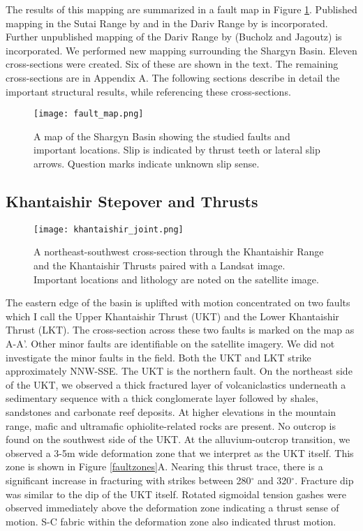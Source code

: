 The results of this mapping are summarized in a fault map in Figure \ref{faultmap}. Published mapping in the Sutai Range by \citet{Cunningham2003} and in the Dariv Range by \citet{Dijkstra2006} is incorporated. Further unpublished mapping of the Dariv Range by (Bucholz and Jagoutz) is incorporated. We performed new mapping surrounding the Shargyn Basin. Eleven cross-sections were created. Six of these are shown in the text. The remaining cross-sections are in Appendix A. The following sections describe in detail the important structural results, while referencing these cross-sections.
 
\begin{figure}[p!]
  \centering
  \texttt{[image: fault\_map.png]}
  \caption{A map of the Shargyn Basin showing the studied faults and important locations. Slip is indicated by thrust teeth or lateral slip arrows. Question marks indicate unknown slip sense.}
  \label{faultmap}
\end{figure}


\subsection{Khantaishir Stepover and Thrusts}

\begin{figure}[p!]
  \centering
  \texttt{[image: khantaishir\_joint.png]}
  \caption{A northeast-southwest cross-section through the Khantaishir Range and the Khantaishir Thrusts paired with a Landsat image. Important locations and lithology are noted on the satellite image.}
\end{figure}

The eastern edge of the basin is uplifted with motion concentrated on two faults which I call the Upper Khantaishir Thrust (UKT) and the Lower Khantaishir Thrust (LKT). The cross-section across these two faults is marked on the map as A-A'. Other minor faults are identifiable on the satellite imagery. We did not investigate the minor faults in the field. Both the UKT and LKT strike approximately NNW-SSE. The UKT is the northern fault. On the northeast side of the UKT, we observed a thick fractured layer of volcaniclastics underneath a sedimentary sequence with a thick conglomerate layer followed by shales, sandstones and carbonate reef deposits. At higher elevations in the mountain range, mafic and ultramafic ophiolite-related rocks are present. No outcrop is found on the southwest side of the UKT. At the alluvium-outcrop transition, we observed a 3-5m wide deformation zone that we interpret as the UKT itself. This zone is shown in Figure \ref{faultzones}A. Nearing this thrust trace, there is a significant increase in fracturing with strikes between 280$^{\circ}$ and 320$^{\circ}$. Fracture dip was similar to the dip of the UKT itself. Rotated sigmoidal tension gashes were observed immediately above the deformation zone indicating a thrust sense of motion. S-C fabric within the deformation zone also indicated thrust motion.

